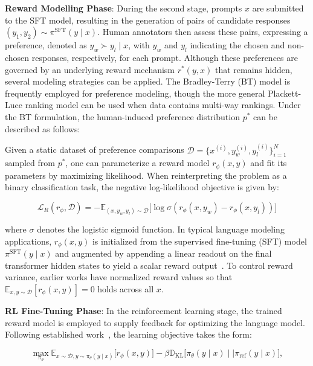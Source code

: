 \textbf{Reward Modelling Phase}: During the second stage, prompts $x$ are submitted to the SFT model, resulting in the generation of pairs of candidate responses $(y_1, y_2)\sim \pi^\text{SFT}(y \mid x)$. Human annotators then assess these pairs, expressing a preference, denoted as $y_w\succ y_l \mid x$, with $y_w$ and $y_l$ indicating the chosen and non-chosen responses, respectively, for each prompt. Although these preferences are governed by an underlying reward mechanism $r^*(y, x)$ that remains hidden, several modeling strategies can be applied. The Bradley-Terry (BT) model \cite{bradley1952rankanalysis} is frequently employed for preference modeling, though the more general Plackett-Luce ranking model \citep{plackett1975analysis, luce2012individual} can be used when data contains multi-way rankings. Under the BT formulation, the human-induced preference distribution $p^*$ can be described as follows:

Given a static dataset of preference comparisons $\mathcal{D}=\bigl\{x^{(i)}, y_w^{(i)}, y_l^{(i)}\bigr\}_{i=1}^N$ sampled from $p^*$, one can parameterize a reward model $r_{\phi}(x, y)$ and fit its parameters by maximizing likelihood. When reinterpreting the problem as a binary classification task, the negative log-likelihood objective is given by:

\begin{equation}\label{eq:reward_model}
    \mathcal{L}_R(r_{\phi}, \mathcal{D}) = -\mathbb{E}_{(x, y_w, y_l)\sim \mathcal{D}}\bigl[\log \sigma(r_{\phi}(x, y_w)- r_{\phi}(x, y_l))\bigr]
\end{equation}

where $\sigma$ denotes the logistic sigmoid function. In typical language modeling applications, $r_{\phi}(x, y)$ is initialized from the supervised fine-tuning (SFT) model $\pi^\text{SFT}(y \mid x)$ and augmented by appending a linear readout on the final transformer hidden states to yield a scalar reward output~\cite{ziegler2020finetuning}. To control reward variance, earlier works have normalized reward values so that $\mathbb{E}_{x,y\sim \mathcal{D}}\left[r_\phi(x, y)\right] = 0$ holds across all $x$.

\textbf{RL Fine-Tuning Phase}: In the reinforcement learning stage, the trained reward model is employed to supply feedback for optimizing the language model. Following established work~\citep{jaques2017sequence, jaques2020human}, the learning objective takes the form:

\begin{equation}\label{eq:RL}
\max_{\pi_{\theta}}  \mathbb{E}_{x\sim \mathcal{D}, y\sim \pi_{\theta}(y \mid x)}\bigl[r_{\phi}(x, y)\bigr] - \beta\mathbb{D}_{\textrm{KL}}\bigl[\pi_{\theta}(y\mid x)\mid \mid \pi_\text{ref}(y\mid x)\bigr],
\end{equation}

